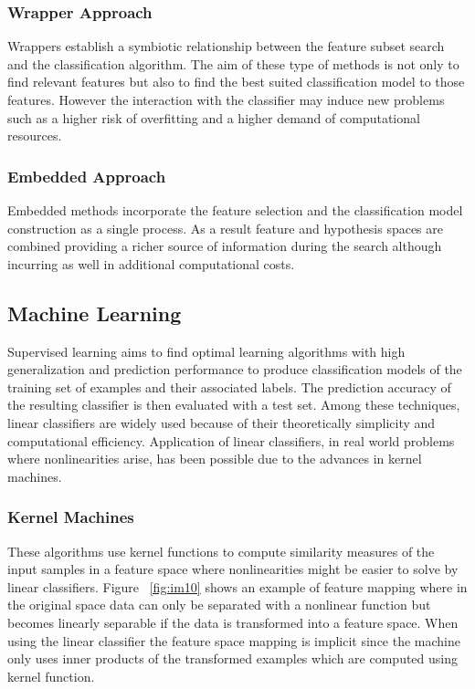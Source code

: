 \subsubsection{Wrapper Approach}
Wrappers establish a symbiotic relationship between the feature subset search and the classification algorithm.  The aim of these type of methods is not only to find relevant features but also to find the best suited classification model to those features.  However the interaction with the classifier may induce new problems such as a higher risk of overfitting and a higher demand of computational resources. 
\subsubsection{Embedded Approach}
Embedded methods incorporate the feature selection and the classification model construction as a single process.  As a result feature and hypothesis spaces are combined providing a richer source of information during the search although incurring as well in additional computational costs.  
\subsection{Machine Learning}
Supervised learning aims to find optimal learning algorithms with high generalization and prediction performance to produce classification models of the training set of examples and their associated labels.  The prediction accuracy of the resulting classifier is then evaluated with a test set.  Among these techniques, linear classifiers are widely used because of their theoretically simplicity and computational efficiency.  Application of linear classifiers, in real world problems where nonlinearities arise, has been possible due to the advances in kernel machines\cite{cristianini04}.
\subsubsection{Kernel Machines}
\label{subsub:kern}
These algorithms use kernel functions to compute similarity measures of the input samples in a feature space where nonlinearities might be easier to solve by linear classifiers.  Figure ~\ref{fig:im10} shows an example of feature mapping where in the original space data can only be separated with a nonlinear function but becomes linearly separable if the data is transformed into a feature space.  When using the linear classifier the feature space mapping is implicit since the machine only uses inner products of the transformed examples which are computed using kernel function.   

